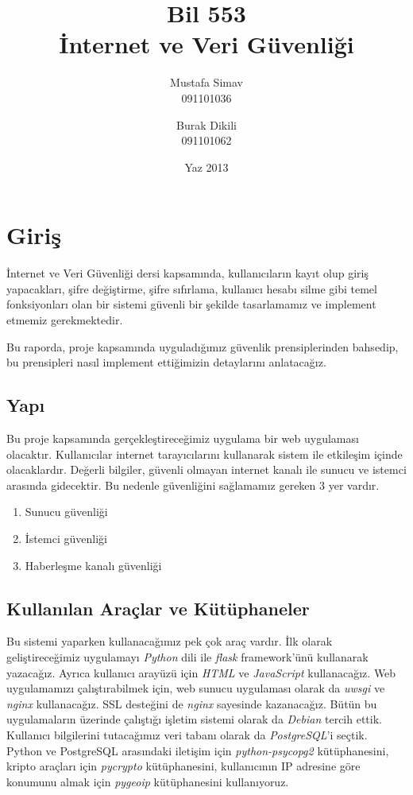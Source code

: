 \documentclass[11pt,a4paper]{report}
\title{\textbf{Bil 553} \\ İnternet ve Veri Güvenliği}
\author{Mustafa Simav \\
       091101036
    \and
        Burak Dikili \\
        091101062}
\date{Yaz 2013}
\begin{document}
\maketitle

\chapter{Giriş}

İnternet ve Veri Güvenliği dersi kapsamında, kullanıcıların kayıt olup giriş yapacakları, şifre değiştirme, şifre sıfırlama, kullanıcı hesabı silme gibi temel fonksiyonları olan bir sistemi güvenli bir şekilde tasarlamamız ve implement etmemiz gerekmektedir.

Bu raporda, proje kapsamında uyguladığımız güvenlik prensiplerinden bahsedip, bu prensipleri nasıl implement ettiğimizin detaylarını anlatacağız.

\section{Yapı}

Bu proje kapsamında gerçekleştireceğimiz uygulama bir web uygulaması olacaktır. Kullanıcılar internet tarayıcılarını kullanarak sistem ile etkileşim içinde olacaklardır. Değerli bilgiler, güvenli olmayan internet kanalı ile sunucu ve istemci arasında gidecektir. Bu nedenle güvenliğini sağlamamız gereken 3 yer vardır.

\begin{enumerate}
\item Sunucu güvenliği
\item İstemci güvenliği
\item Haberleşme kanalı güvenliği
\end{enumerate}

\section{Kullanılan Araçlar ve Kütüphaneler}

Bu sistemi yaparken kullanacağımız pek çok araç vardır. İlk olarak geliştireceğimiz uygulamayı \emph{Python} dili ile \emph{flask} framework'ünü kullanarak yazacağız. Ayrıca kullanıcı arayüzü için \emph{HTML} ve \emph{JavaScript} kullanacağız. Web uygulamamızı çalıştırabilmek için, web sunucu uygulaması olarak da \emph{uwsgi} ve \emph{nginx} kullanacağız. SSL desteğini de \emph{nginx} sayesinde kazanacağız. Bütün bu uygulamaların üzerinde çalıştığı işletim sistemi olarak da \emph{Debian} tercih ettik. Kullanıcı bilgilerini tutacağımız veri tabanı olarak da \emph{PostgreSQL}'i seçtik. Python ve PostgreSQL arasındaki iletişim için \emph{python-psycopg2} kütüphanesini, kripto araçları için \emph{pycrypto} kütüphanesini, kullanıcının IP adresine göre konumunu almak için \emph{pygeoip} kütüphanesini kullanıyoruz.
\end{document}
